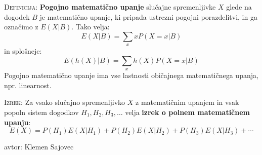 \documentclass[8pt,a4paper]{amsart}
\theoremstyle{definition} %
\theoremstyle{plain} %
\begin{document}
\textsc{Definicija:} \textbf{Pogojno matematično upanje} slučajne spremenljivke $X$ glede na dogodek $B$ je matematično upanje, ki pripada ustrezni pogojni porazdelitvi, in ga označimo z $E(X | B)$. Tako velja:
$$
E(X | B) = \sum_x xP(X=x | B)
$$
in splošneje:
$$
E(h(X) | B) = \sum_x h(X) P(X=x | B)
$$
Pogojno matematično upanje ima vse lastnosti običajnega matematičnega upanja, npr. linearnost. 

\textsc{Izrek:} Za vsako slučajno spremenljivko $X$ z matematičnim upanjem in vsak popoln sistem dogodkov $H_1, H_2, H_3, \ldots $ velja \textbf{izrek o polnem matematičnem upanju}:
$$
E(X) = P(H_1)E(X|H_1) + P(H_2)E(X | H_2) + P(H_3)E(X | H_3) + \cdots
$$


\vfill \hfill avtor: Klemen Sajovec
\end{document}
